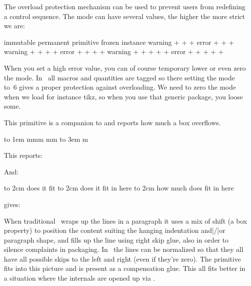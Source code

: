 \startnewprimitive[title={\prm {overloadmode}}]

The overload protection mechanism can be used to prevent users from redefining
a control sequence. The mode can have several values, the higher the more strict
we are:

\starttabulate[||||||||]
    \NC   \NC         \NC immutable \NC permanent \NC primitive \NC frozen \NC instance \NC \NR
     \NC warning \NC +         \NC +         \NC +         \NC        \NC          \NC \NR
     \NC error   \NC +         \NC +         \NC +         \NC        \NC          \NC \NR
     \NC warning \NC +         \NC +         \NC +         \NC +      \NC          \NC \NR
     \NC error   \NC +         \NC +         \NC +         \NC +      \NC          \NC \NR
     \NC warning \NC +         \NC +         \NC +         \NC +      \NC +        \NC \NR
     \NC error   \NC +         \NC +         \NC +         \NC +      \NC +        \NC \NR
\stoptabulate

When you set a high error value, you can of course temporary lower or even zero
the mode. In \CONTEXT\ all macros and quantities are tagged so there setting the
mode to~6 gives a proper protection against overloading. We need to zero the mode
when we load for instance tikz, so when you use that generic package, you loose
some.

\stopnewprimitive

\startnewprimitive[title={\prm {overshoot}}]

This primitive is a companion to  and reports how much a box
overflows.

\startbuffer
{}\hbox to 1em {mmm} \the\badness\quad\the\overshoot
{}\hbox         {mm} \the\badness\quad\the\overshoot
{}\hbox to 3em   {m} \the\badness\quad\the\overshoot
\stopbuffer

\typebuffer

This reports:

\startlines
\getbuffer
\stoplines

And:

\startbuffer
\hbox to 2cm {does it fit}               \the\overshoot
\hbox to 2cm {does it fit in here}       \the\overshoot
\hbox to 2cm {how much does fit in here} \the\overshoot
\stopbuffer

\typebuffer

gives:

\startlines
\getbuffer
\stoplines

When traditional \TEX\ wraps up the lines in a paragraph it uses a mix of shift
(a box property) to position the content suiting the hanging indentation and|/|or
paragraph shape, and fills up the line using right skip glue, also in order to
silence complaints in packaging. In \LUAMETATEX\ the lines can be normalized so
that they all have all possible skips to the left and right (even if they're
zero). The  primitive fits into this picture and is present as a
compensation glue. This all fits better in a situation where the internals are
opened up via \LUA.

